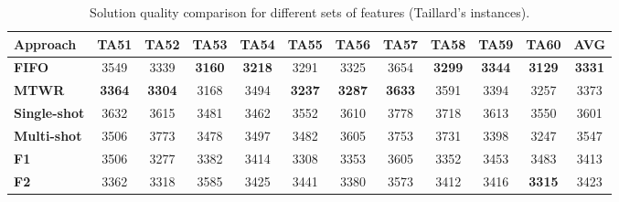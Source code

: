 \documentclass[runningheads]{llncs}
\begin{document}
\begin{table}[bt]
  \begin{center}
    \caption{Solution quality comparison for different sets of features (Taillard's instances).}
    \label{tab4}
    \addtolength{\tabcolsep}{1pt}
    \begin{tabular}{|l|c|c|c|c|c|c|c|c|c|c|c|} \hline
      \textbf{Approach}   & TA51                           & TA52                           & TA53                           & TA54 & TA55                           & TA56                           & TA57                           & TA58 & TA59                           & TA60 & AVG  \\ \hline\hline
      \textbf{FIFO}        & 3549                           & 3339                           & \textbf{3160}              & \textbf{3218} & 3291               & 3325                           & 3654                           & \textbf{3299} & \textbf{3344}                           & \textbf{3129} & \textbf{3331} \\
      \textbf{MTWR}        & \textbf{3364}           & \textbf{3304}              & 3168                           & 3494 & \textbf{3237}                           & \textbf{3287}               & \textbf{3633}              & 3591 & 3394                           & 3257 & 3373 \\
      \textbf{Single-shot} & 3632                           & 3615                           & 3481                           & 3462 & 3552                           & 3610                           & 3778                           & 3718 & 3613                           & 3550 & 3601 \\ %
      \textbf{Multi-shot}         & 3506                           & 3773                           & 3478                           & 3497 & 3482                           & 3605                           & 3753                           & 3731 & 3398                           & 3247 & 3547 \\ \hline
      \textbf{F1}          & 3506                           & 3277                           & 3382                           & 3414 & 3308                           & 3353                           & 3605                           & 3352 & 3453                           & 3483 & 3413 \\
      \textbf{F2}          & 3362                           & 3318                           & 3585                           & 3425 & 3441                           & 3380                           & 3573                           & 3412 & 3416                           & \textbf{3315} & 3423 \\

\end{tabular}
\end{center}
\end{table}
\end{document}
